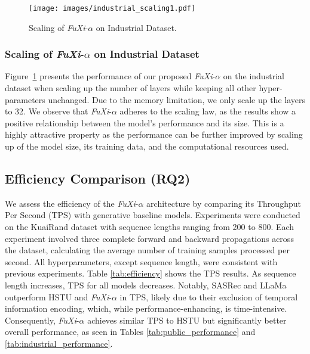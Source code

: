 \begin{figure}
    \centering
    \setlength{\abovecaptionskip}{0pt}
    \setlength{\belowcaptionskip}{-15pt}
        \texttt{[image: images/industrial\_scaling1.pdf]}
    \caption{Scaling of \textit{FuXi}-$\alpha$ on Industrial Dataset.}
    \label{fig:industrial_scaling}
\end{figure}

\subsubsection{Scaling of \textit{FuXi}-$\alpha$ on Industrial Dataset}
Figure~\ref{fig:industrial_scaling} presents the performance of our proposed \textit{FuXi}-$\alpha$ on the industrial dataset when scaling up the number of layers while keeping all other hyper-parameters unchanged. 
Due to the memory limitation, we only scale up the layers to 32.
We observe that \textit{FuXi}-$\alpha$ adheres to the scaling law, as the results show a positive relationship between the model's performance and its size.
This is a highly attractive property as the performance can be further improved by scaling up of the model size, its training data, and the computational resources used.

\subsection{Efficiency Comparison (RQ2)}\label{EfficiencyComparison}

We assess the efficiency of the \textit{FuXi}-$\alpha$ architecture by comparing its Throughput Per Second (TPS) with generative baseline models. Experiments were conducted on the KuaiRand dataset with sequence lengths ranging from 200 to 800. Each experiment involved three complete forward and backward propagations across the dataset, calculating the average number of training samples processed per second. All hyperparameters, except sequence length, were consistent with previous experiments. Table \ref{tab:efficiency} shows the TPS results. As sequence length increases, TPS for all models decreases. Notably, SASRec and LLaMa outperform HSTU and \textit{FuXi}-$\alpha$ in TPS, likely due to their exclusion of temporal information encoding, which, while performance-enhancing, is time-intensive. Consequently, \textit{FuXi}-$\alpha$ achieves similar TPS to HSTU but significantly better overall performance, as seen in Tables \ref{tab:public_performance} and \ref{tab:industrial_performance}.

